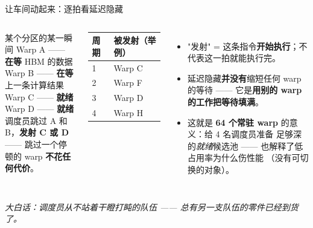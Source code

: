 \documentclass[aspectratio=169]{beamer}
\newcommand{\kw}[1]{\textbf{\textcolor{kwblue}{#1}}}
\newcommand{\pe}[1]{{\footnotesize\itshape 大白话：#1}}
\begin{document}
\begin{frame}{让车间动起来：逐拍看延迟隐藏}
  \begin{columns}[t]
    \begin{block}{某个分区的某一瞬间}
      \small
      Warp A —— \kw{在等} HBM 的数据\\
      Warp B —— \kw{在等}上一条计算结果\\
      Warp C —— \kw{就绪}\qquad Warp D —— \kw{就绪}\\[4pt]
      调度员跳过 A 和 B，\kw{发射 C 或 D} ——
      跳过一个停顿的 warp \kw{不花任何代价}。
    \end{block}
    {\small
    \begin{tabular}{@{}ll@{}}
      \toprule
      \textbf{周期} & \textbf{被发射（举例）} \\
      \midrule
      1 & Warp C \\
      2 & Warp F \\
      3 & Warp D \\
      4 & Warp H \\
      \bottomrule
    \end{tabular}}
    \begin{itemize}
      \item "发射" = 这条指令\kw{开始执行}；不代表这一拍就能执行完。
      \item 延迟隐藏\kw{并没有}缩短任何 warp 的等待 ——
            它是\kw{用别的 warp 的工作把等待填满}。
      \item 这就是 \kw{64 个常驻 warp} 的意义：给 4 名调度员准备
            足够深的\emph{就绪}候选池 —— 也解释了低占用率为什么伤性能
            （没有可切换的对象）。
    \end{itemize}
  \end{columns}
  \medskip
  \pe{调度员从不站着干瞪打盹的队伍 —— 总有另一支队伍的零件已经到货了。}
\end{frame}
\end{document}
